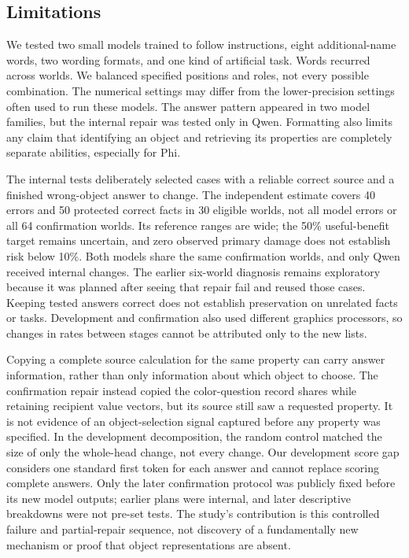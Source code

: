 \documentclass[10pt,letterpaper]{article}
\begin{document}
\subsection*{Limitations}

We tested two small models trained to follow instructions, eight additional-name words, two wording formats, and one kind of artificial task. Words recurred across worlds. We balanced specified positions and roles, not every possible combination. The numerical settings may differ from the lower-precision settings often used to run these models. The answer pattern appeared in two model families, but the internal repair was tested only in Qwen. Formatting also limits any claim that identifying an object and retrieving its properties are completely separate abilities, especially for Phi.


The internal tests deliberately selected cases with a reliable correct source and a finished wrong-object answer to change. The independent estimate covers 40 errors and 50 protected correct facts in 30 eligible worlds, not all model errors or all 64 confirmation worlds. Its reference ranges are wide; the 50\% useful-benefit target remains uncertain, and zero observed primary damage does not establish risk below 10\%. Both models share the same confirmation worlds, and only Qwen received internal changes. The earlier six-world diagnosis remains exploratory because it was planned after seeing that repair fail and reused those cases. Keeping tested answers correct does not establish preservation on unrelated facts or tasks. Development and confirmation also used different graphics processors, so changes in rates between stages cannot be attributed only to the new lists.


Copying a complete source calculation for the same property can carry answer information, rather than only information about which object to choose. The confirmation repair instead copied the color-question record shares while retaining recipient value vectors, but its source still saw a requested property. It is not evidence of an object-selection signal captured before any property was specified. In the development decomposition, the random control matched the size of only the whole-head change, not every change. Our development score gap considers one standard first token for each answer and cannot replace scoring complete answers. Only the later confirmation protocol was publicly fixed before its new model outputs; earlier plans were internal, and later descriptive breakdowns were not pre-set tests. The study's contribution is this controlled failure and partial-repair sequence, not discovery of a fundamentally new mechanism or proof that object representations are absent.
\end{document}
